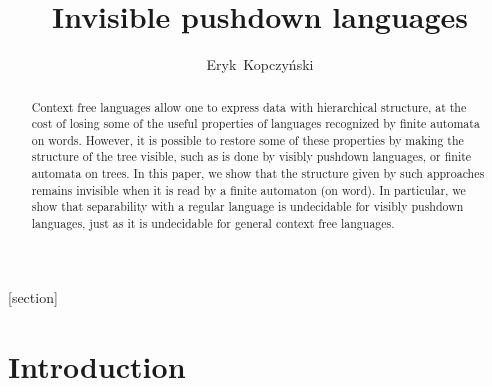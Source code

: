 \documentclass{article}
\title{Invisible pushdown languages}
\author{Eryk~Kopczy\'nski}
\begin{document}
\maketitle

[section]
\renewcommand{\themycount}{\thesection.\arabic{mycount}}

\newtheorem{theorem}[mycount]{Theorem}
\newtheorem{lemma}[mycount]{Lemma}
\newtheorem{definition}[mycount]{Definition}
\newtheorem{problem}[mycount]{Problem}


\newenvironment{proof}[1][]{\medskip{\bf Proof #1 }}{}
\def\qed{\hfill$\rule{2mm}{2mm}$\par\medskip}

\def\mod{{\rm{\ mod\ }}}
\def\ra{\rightarrow}
\def\la{\leftarrow}
\def\trans{\delta}
\def\rh{|}
\def\ut{\tau}
\def\emt{\emptyset}
\def\Port{{\rm{port}}}
\def\Aut{\mathcal A}
\def\Lang{\mathcal L}
\def\restrict{{\rm{Restrict}}}

\def\dom{{\rm{dom}}}
\def\bia{\{0,1\}}
\def\i{\hskip 2em}
\def\EOT{{\rm EOT}}
\def\pat{p}

\def\calC{{\mathcal C}}
\def\bbN{{\mathbb N}}
\def\PaV{V^P}
\def\PaE{E^P}
\def\SpV{{V^\tau}}
\def\SpE{{E^\tau}}
\def\SpR{{v^\tau}}

\def\bbN{{\mathbb N}}
\def\bbR{{\mathbb R}}
\def\bbP{{\mathbb P}}
\def\bbZ{{\mathbb Z}}
\def\bbC{{\mathbb C}}
\def\oa{\diamondsuit}
\def\ca{\overbar{\diamondsuit}}
\def\leaf{\spadesuit}

\newcommand{\overbar}[1]{\mkern 1.5mu\overline{\mkern-1.5mu#1\mkern-1.5mu}\mkern 1.5mu}

\begin{abstract}
Context free languages allow one to express data with hierarchical structure,
at the cost of losing some of the useful properties of languages recognized by 
finite automata on words. However, it is possible
to restore some of these properties by making the structure of the tree visible, 
such as is done by visibly pushdown languages, or finite automata on trees.
In this paper, we show that the structure given by such approaches remains
invisible when it is read by a finite automaton (on word).
In particular, we show
that separability with a regular language
is undecidable for visibly pushdown languages, just as it is undecidable for
general context free languages.
\end{abstract}

\section{Introduction}
\end{document}
